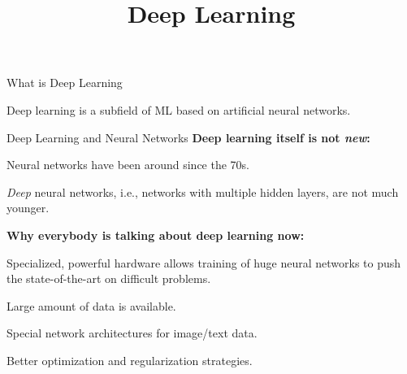\documentclass[11pt,compress,t,notes=noshow, xcolor=table]{beamer}
\title{Deep Learning}
\begin{document}


\begin{framei}{What is Deep Learning}
\item Deep learning is a subfield of ML based on artificial neural networks.
\end{framei}


\begin{frame}{Deep Learning and Neural Networks}
\textbf{Deep learning itself is not \textit{new}:}
\begin{itemizeM}
\item Neural networks have been around since the 70s.
\item \textit{Deep} neural networks, i.e., networks with multiple hidden layers, are not much younger.
\end{itemizeM}
\textbf{Why everybody is talking about deep learning now:}
\begin{itemizeM}
\item Specialized, powerful hardware allows training of huge neural networks to push the state-of-the-art on difficult problems.
\item Large amount of data is available.
\item Special network architectures for image/text data.
\item Better optimization and regularization strategies.
\end{itemizeM}
\end{frame}
\end{document}
